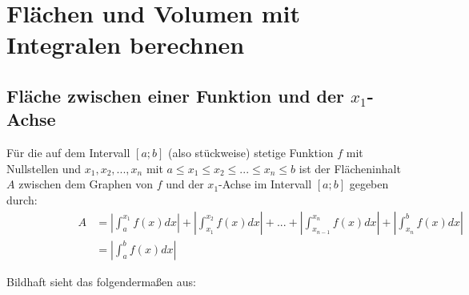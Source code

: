 \documentclass[main.tex]{subfiles}
\begin{document}
\section{Flächen und Volumen mit Integralen berechnen}

\subsection{Fläche zwischen einer Funktion und der $x_1$-Achse}
\begin{Definition}
  Für die auf dem Intervall $[a;b]$ (also stückweise) stetige Funktion $f$ mit Nullstellen und $x_1,x_2,...,x_n$
  mit $a \leq x_1 \leq x_2 \leq ... \leq x_n \leq b$ ist der Flächeninhalt $A$ zwischen dem Graphen von $f$ und
  der $x_1$-Achse im Intervall $[a;b]$ gegeben durch:
  \begin{align*}
    \qquad\qquad\qquad A &= \left|{\int_a^{x_1} f(x)dx}\right|+\left|{\int_{x_1}^{x_2} f(x)dx}\right|+...+\left|{\int_{x_{n-1}}^{x_n} f(x)dx}\right|+\left|{\int_{x_n}^b f(x)dx}\right|\\
    &= \left|{\int_a^{b} f(x)dx}\right|
  \end{align*}
\end{Definition}
Bildhaft sieht das folgendermaßen aus:\\
\end{document}

